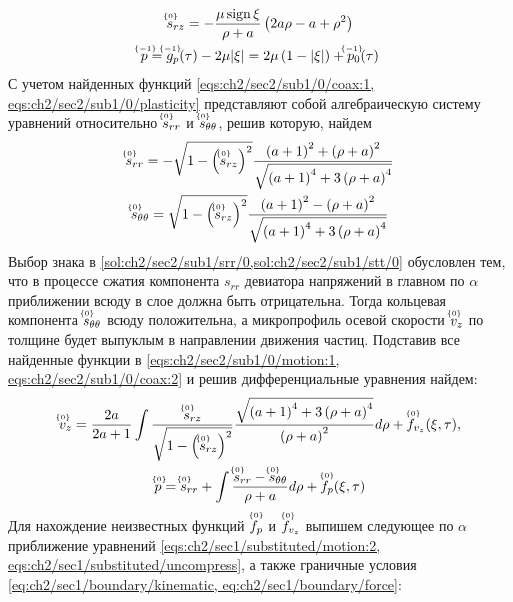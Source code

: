 \begin{gather}
  \label{sol:ch2/sec2/sub1/srz/0}
  \uindex{s}{0}_{rz} = -\frac{\mu\sign\xi}{\rho+a}\left(2a\rho-a+\rho^2\right)
  \\
  \label{sol:ch2/sec2/sub1/p/-1}
  \uindex{p}{-1} = \uindex{g}{-1}_{p}(\tau) -2\mu\lvert\xi\rvert = 2\mu\left(1-\lvert\xi\rvert\right) + \uindex{p}{-1}_{0}(\tau)
\end{gather}
С учетом найденных функций \cref{eqs:ch2/sec2/sub1/0/coax:1, eqs:ch2/sec2/sub1/0/plasticity} представляют собой алгебраическую систему уравнений относительно $\uindex{s}{0}_{rr}$ и $\uindex{s}{0}_{\theta\theta}$, решив которую, найдем
\begin{gather}
  \label{sol:ch2/sec2/sub1/srr/0}
  \uindex{s}{0}_{rr} = -\sqrt{1-\left(\uindex{s}{0}_{rz}\right)^2}\frac{\left(a+1\right)^2+\left(\rho+a\right)^2}{\sqrt{\left(a+1\right)^4+3\left(\rho+a\right)^4}}
  \\
  \label{sol:ch2/sec2/sub1/stt/0}
  \uindex{s}{0}_{\theta\theta} = \sqrt{1-\left(\uindex{s}{0}_{rz}\right)^2}\frac{\left(a+1\right)^2-\left(\rho+a\right)^2}{\sqrt{\left(a+1\right)^4+3\left(\rho+a\right)^4}}
\end{gather}
Выбор знака в \cref{sol:ch2/sec2/sub1/srr/0,sol:ch2/sec2/sub1/stt/0} обусловлен тем, что в процессе сжатия компонента $s_{rr}$ девиатора напряжений в главном по $\alpha$ приближении всюду в слое должна быть отрицательна. Тогда кольцевая компонента $\uindex{s}{0}_{\theta\theta}$ всюду положительна, а микропрофиль осевой скорости $\uindex{v}{0}_{z}$ по толщине будет выпуклым в направлении движения частиц. Подставив все найденные функции в \cref{eqs:ch2/sec2/sub1/0/motion:1, eqs:ch2/sec2/sub1/0/coax:2} и решив дифференциальные уравнения найдем:
\begin{gather}
  \label{sol:ch2/sec2/sub1/vz/0}
  \uindex{v}{0}_{z} = \frac{2a}{2a+1}\int{\frac{\uindex{s}{0}_{rz}}{\sqrt{1-\left(\uindex{s}{0}_{rz}\right)^2}}}\frac{\sqrt{\left(a+1\right)^4+3\left(\rho+a\right)^4}}{\left(\rho+a\right)^2}d\rho + \uindex{f}{0}_{v_{z}}(\xi,\tau),
  \\
  \label{sol:ch2/sec2/sub1/p/0}
  \uindex{p}{0} = \uindex{s}{0}_{rr} + \int{\frac{\uindex{s}{0}_{rr}-\uindex{s}{0}_{\theta\theta}}{\rho+a}d\rho}+\uindex{f}{0}_{p}(\xi,\tau)
\end{gather}
Для нахождение неизвестных функций $\uindex{f}{0}_{p}$ и $\uindex{f}{0}_{v_{z}}$ выпишем следующее по $\alpha$ приближение уравнений \cref{eqs:ch2/sec1/substituted/motion:2, eqs:ch2/sec1/substituted/uncompress}, а также граничные условия \cref{eq:ch2/sec1/boundary/kinematic, eq:ch2/sec1/boundary/force}:
